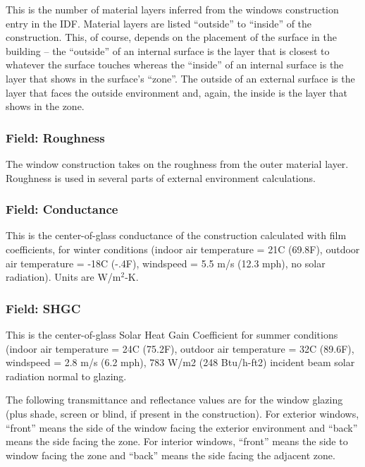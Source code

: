 This is the number of material layers inferred from the windows construction entry in the IDF. Material layers are listed ``outside'' to ``inside'' of the construction. This, of course, depends on the placement of the surface in the building -- the ``outside'' of an internal surface is the layer that is closest to whatever the surface touches whereas the ``inside'' of an internal surface is the layer that shows in the surface's ``zone''. The outside of an external surface is the layer that faces the outside environment and, again, the inside is the layer that shows in the zone.

\subsubsection{Field: Roughness}\label{field-roughness-1}

The window construction takes on the roughness from the outer material layer. Roughness is used in several parts of external environment calculations.

\subsubsection{Field: Conductance}\label{field-conductance}

This is the center-of-glass conductance of the construction calculated with film coefficients, for winter conditions (indoor air temperature = 21C (69.8F), outdoor air temperature = -18C (-.4F), windspeed = 5.5 m/s (12.3 mph), no solar radiation). Units are W/m\(^{2}\)-K.

\subsubsection{Field: SHGC}\label{field-shgc}

This is the center-of-glass Solar Heat Gain Coefficient for summer conditions (indoor air temperature = 24C (75.2F), outdoor air temperature = 32C (89.6F), windspeed = 2.8 m/s (6.2 mph), 783 W/m2 (248 Btu/h-ft2) incident beam solar radiation normal to glazing.

The following transmittance and reflectance values are for the window glazing (plus shade, screen or blind, if present in the construction). For exterior windows, ``front'' means the side of the window facing the exterior environment and ``back'' means the side facing the zone. For interior windows, ``front'' means the side to window facing the zone and ``back'' means the side facing the adjacent zone.


